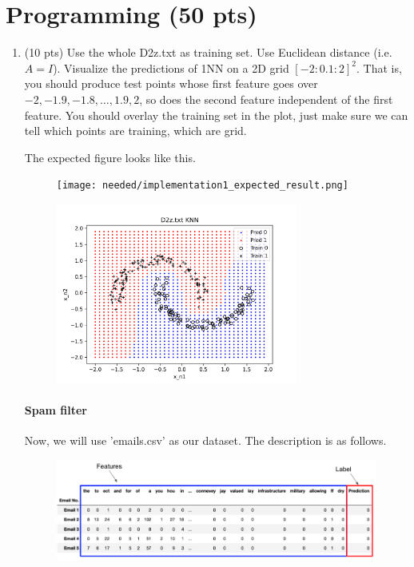 \documentclass[a4paper]{article}
\theoremstyle{definition}
\newenvironment{soln}{
    \leavevmode\color{blue}\ignorespaces
}{}
\begin{document}
\section{Programming (50 pts)}
\begin{enumerate}
	\item (10 pts) Use the whole D2z.txt as training set.  Use Euclidean distance (i.e. $A=I$).
	Visualize the predictions of 1NN on a 2D grid $[-2:0.1:2]^2$.
	That is, you should produce test points whose first feature goes over $-2, -1.9, -1.8, \ldots, 1.9, 2$, so does the second feature independent of the first feature.
	You should overlay the training set in the plot, just make sure we can tell which points are training, which are grid.
	
	The expected figure looks like this.
	\begin{figure}[h]
		\centering
		\texttt{[image: needed/implementation1\_expected\_result.png]}
	\end{figure}
 	\begin{soln}
            \begin{figure}[H]
                \centering
                \includegraphics[width=0.75\textwidth]{figs/q2/p1/D2z.txt_KNN.png} 
                \captionsetup{labelformat=empty}
                \caption{}
                \label{fig:my_label}
             \end{figure}
        \end{soln}
	
	\paragraph{Spam filter} Now, we will use 'emails.csv' as our dataset. The description is as follows.
	\begin{figure}[h]
		\centering
		\includegraphics[width=\linewidth]{needed/email_head.png}
	\end{figure}
	

\end{enumerate}
\end{document}
